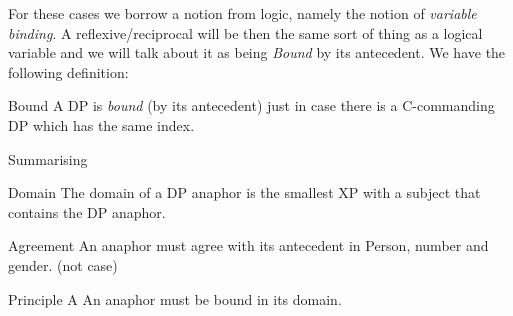 \begin{frame}
  For these cases we borrow a notion from logic, namely the notion of \textit{variable binding}.  A reflexive/reciprocal will be then the same sort of thing as a logical variable and we will talk about it as being \textit{Bound} by its antecedent.  We have the following definition:


  \begin{block}
    {Bound}
    A DP is \textit{bound} (by its antecedent) just in case there is a C-commanding DP which has the same index.
  \end{block}

\end{frame}


\begin{frame}
{Summarising}
\begin{block}
  {Domain}
The domain of a DP anaphor is the smallest XP with a subject that contains the DP anaphor.
\end{block}
\begin{block}
  {Agreement}
An anaphor must agree with its antecedent in Person, number and gender. (not case)
\end{block}
\begin{block}
  {Principle A}
An anaphor must be bound in its domain.
\end{block}
  
\end{frame}





